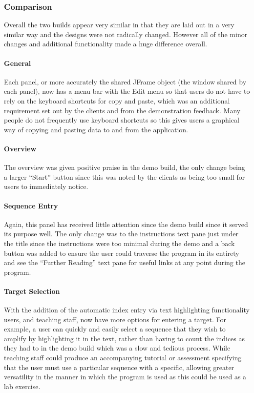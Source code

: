 \subsubsection{Comparison}

Overall the two builds appear very similar in that they are laid out
in a very similar way and the designs were not radically changed.
However all of the minor changes and additional functionality made a
huge difference overall.

\paragraph{General}
Each panel, or more accurately the shared JFrame object (the window
shared by each panel), now has a menu bar with the Edit menu so that
users do not have to rely on the keyboard shortcuts for copy and
paste, which was an additional requirement set out by the clients and
from the demonstration feedback.
Many people do not frequently use keyboard shortcuts so this gives
users a graphical way of copying and pasting data to and from the
application.

\paragraph{Overview}
The overview was given positive praise in the demo build, the only
change being a larger ``Start'' button since this was noted by the
clients as being too small for users to immediately notice.

\paragraph{Sequence Entry}
Again, this panel has received little attention since the demo build
since it served its purpose well.
The only change was to the instructions text pane just under the title
since the instructions were too minimal during the demo and a back
button was added to ensure the user could traverse the program in its
entirety and see the ``Further Reading'' text pane for useful links at
any point during the program.

\paragraph{Target Selection}
With the addition of the automatic index entry via text highlighting
functionality users, and teaching staff, now have more options for
entering a target.
For example, a user can quickly and easily select a sequence that they
wish to amplify by highlighting it in the text, rather than having to
count the indices as they had to in the demo build which was a slow
and tedious process.
While teaching staff could produce an accompanying tutorial or
assessment specifying that the user must use a particular sequence
with a specific, allowing greater versatility in the manner in which
the program is used as this could be used as a lab exercise.

